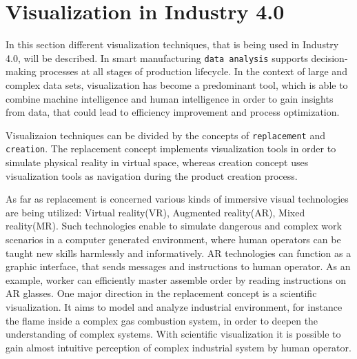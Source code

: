 \documentclass[thesis=B,english]{FITthesis}[2019/12/23]
\begin{document}
\section{Visualization in Industry 4.0}

In this section different visualization techniques, that is being used in Industry 4.0, will be described. In smart manufacturing \verb|data analysis| supports decision-making processes at all stages of production lifecycle. In the context of large and complex data sets, visualization has become a predominant tool, which is able to combine machine intelligence and human intelligence in order to gain insights from data, that could lead to efficiency improvement and process optimization.

Visualizaion techniques can be divided by the concepts of \verb|replacement| and \verb|creation|. The replacement concept implements visualization tools in order to simulate physical reality in virtual space, whereas creation concept uses visualization tools as navigation during the product creation process. 

As far as replacement is concerned various kinds of immersive visual technologies are being utilized: Virtual reality(VR), Augmented reality(AR), Mixed reality(MR). Such technologies enable to simulate dangerous and complex work scenarios in a computer generated environment, where human operators can be taught new skills harmlessly and informatively. AR technologies can function as a graphic interface, that sends messages and instructions to human operator. As an example, worker can efficiently master assemble order by reading instructions on AR glasses. One major direction in the replacement concept is a scientific visualization. It aims to model and analyze industrial environment, for instance the flame inside a complex gas combustion system, in order to deepen the understanding of complex systems. With scientific visualization it is possible to gain almost intuitive perception of complex industrial system by human operator.
\end{document}
